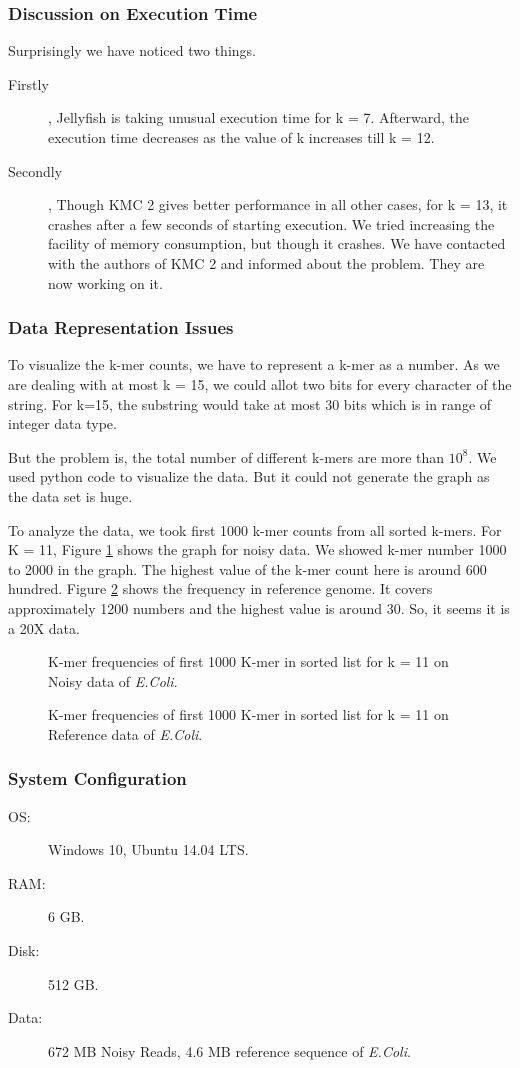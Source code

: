 \documentclass{standalone}
\begin{document}
\subsubsection{Discussion on Execution Time}
Surprisingly we have noticed two things.
\begin{description}
	\item[Firstly], Jellyfish is taking unusual execution time for k = 7. Afterward, the execution time decreases as the value of k increases till k = 12.
	\item[Secondly], Though KMC 2 gives better performance in all other cases, for k = 13, it crashes after a few seconds of starting execution. We tried increasing the facility of memory consumption, but though it crashes. We have contacted with the authors of KMC 2 and informed about the problem. They are now working on it.
\end{description}

\subsubsection{Data Representation Issues}
To visualize the k-mer counts, we have to represent a k-mer as a number. As we are dealing with at most k = 15, we could allot two bits for every character of the string. For k=15, the substring would take at most 30 bits which is in range of integer data type.

But the problem is, the total number of different k-mers are more than $10^8$. We used python code to visualize the data. But it could not generate the graph as the data set is huge.

To analyze the data, we took first 1000 k-mer counts from all sorted k-mers. For K = 11, Figure \ref{fig:TC3} shows the graph for noisy data. We showed k-mer number 1000 to 2000 in the graph. The highest value of the k-mer count here is around 600 hundred. Figure \ref{fig:TC4} shows the frequency in reference genome. It covers approximately 1200 numbers and the highest value is around 30. So, it seems it is a 20X data.
\begin{figure}[ht]
	\centering
	\caption{K-mer frequencies of first 1000 K-mer in sorted list for k = 11 on Noisy data of \emph{E.Coli}.}
	\label{fig:TC3}
\end{figure}
\begin{figure}[ht]
	\centering
	\caption{K-mer frequencies of first 1000 K-mer in sorted list for k = 11 on Reference data of \emph{E.Coli}.}
	\label{fig:TC4}
\end{figure}

\subsubsection{System Configuration}
\begin{description}
	\item[OS:] Windows 10, Ubuntu 14.04 LTS.
	\item[RAM:] 6 GB.
	\item[Disk:] 512 GB.
	\item[Data:] 672 MB Noisy Reads, 4.6 MB reference sequence of \emph{E.Coli}.
\end{description}
\end{document}
